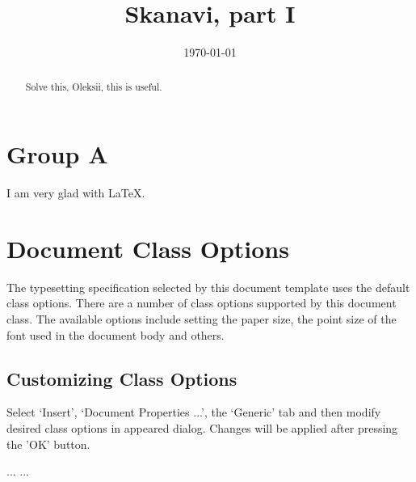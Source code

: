 \documentclass{article}
\begin{document}
\title{Skanavi, part I}  
\date{\today}
\maketitle

\begin{abstract}
    Solve this, Oleksii, this is useful. 
\end{abstract}

\section{Group A}

\begin{enumerate}
\item {$\frac{\frac{1}{a}-\frac{1}{b+c}}{\frac{1}{a} + \frac{1}{b+c}}(1+\frac{b^{2}+c^{2}-a^{2}}{2bc}):\frac{a-b-c}{abc}$$;
 
$==$

$1+==$

$**=**=$

\item dddddd

\end{enumerate}

I am very glad with LaTeX{}.

\section{Document Class Options}
The typesetting specification selected by this document template
uses the default class options. There are a number of class options 
supported by this document class. The available options include 
setting the paper size, the point size of the font used in the 
document body and others.

\subsection{Customizing Class Options}
Select `Insert', `Document Properties ...', the `Generic' tab
and then modify desired class options in appeared dialog.
Changes will be applied after pressing the 'OK' button.

\begin{thebibliography}{99}
 ...
 ...
\end{thebibliography}
\end{document}
